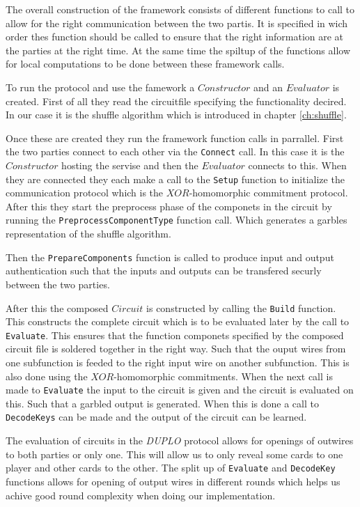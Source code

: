 \documentclass[twoside,11pt,openright]{report}
\newcommand{\DUPLO}{\textit{DUPLO} }
\begin{document}
The overall construction of the framework consists of different functions to call to allow for the right communication between the two partis. It is specified in wich order thes function should be called to ensure that the right information are at the parties at the right time. At the same time the spiltup of the functions allow for local computations to be done between these framework calls.

To run the protocol and use the famework a $Constructor$ and an $Evaluator$ is created. First of all they read the circuitfile specifying the functionality decired. In our case it is the shuffle algorithm which is introduced in chapter \ref{ch:shuffle}.

Once these are created they run the framework function calls in parrallel. First the two parties connect to each other via the \verb|Connect| call. In this case it is the $Constructor$ hosting the servise and then the $Evaluator$ connects to this. When they are connected they each make a call to the \verb|Setup| function to initialize the communication protocol which is the $XOR$-homomorphic commitment protocol. After this they start the preprocess phase of the componets in the circuit by running the \verb|PreprocessComponentType| function call. Which generates a garbles representation of the shuffle algorithm.

Then the \verb|PrepareComponents| function is called to produce input and output authentication such that the inputs and outputs can be transfered securly between the two parties.

After this the composed $Circuit$ is constructed by calling the \verb|Build| function. This constructs the complete circuit which is to be evaluated later by the call to \verb|Evaluate|. This ensures that the function componets specified by the composed circuit file is soldered together in the right way. Such that the ouput wires from one subfunction is feeded to the right input wire on another subfunction. This is also done using the $XOR$-homomorphic commitments. When the next call is made to \verb|Evaluate| the input to the circuit is given and the circuit is evaluated on this. Such that a garbled output is generated. When this is done a call to \verb|DecodeKeys| can be made and the output of the circuit can be learned.

\bigskip

The evaluation of circuits in the \DUPLO protocol allows for openings of outwires to both parties or only one. This will allow us to only reveal some cards to one player and other cards to the other. The split up of \verb|Evaluate| and \verb|DecodeKey| functions allows for opening of output wires in different rounds which helps us achive good round complexity when doing our implementation.
\end{document}
